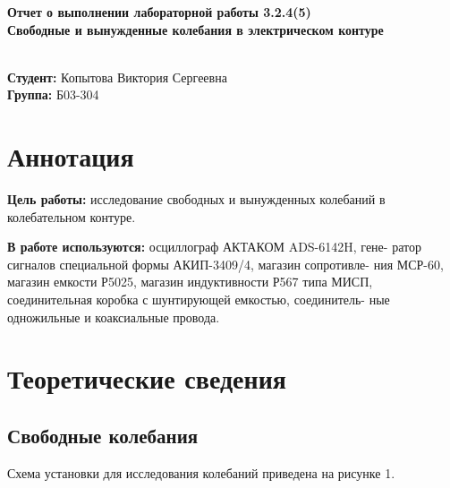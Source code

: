 \documentclass[a4paper,12 pt]{article}
\begin{document}
    \begin{titlepage}
    \begin{center}
        \vspace{4cm}
        \huge {\textbf{Отчет о выполнении лабораторной работы 3.2.4(5) }}
        {} \\
        \vspace{1cm}
        \Large {\textbf{Свободные и вынужденные колебания в электрическом контуре}} \\
        \Large {\textbf{}} \\
        \vspace{10cm}
        \begin{flushright}
        \begin{minipage}{.45\textwidth}
        \normalsize{\textbf{Студент:} Копытова Виктория Сергеевна}\\
        \textbf{Группа:} Б03-304\\
        \end{minipage}
        \end{flushright}   
    \end{center}
    \end{titlepage}
\newpage
 
\section{Аннотация}
\textbf{Цель работы:} исследование свободных и вынужденных колебаний в
колебательном контуре.

\textbf{В работе используются:} осциллограф АКТАКОМ ADS-6142H, гене-
ратор сигналов специальной формы АКИП-3409/4, магазин сопротивле-
ния МСР-60, магазин емкости Р5025, магазин индуктивности Р567 типа
МИСП, соединительная коробка с шунтирующей емкостью, соединитель-
ные одножильные и коаксиальные провода.
	

\section{Теоретические сведения}

\subsection{Свободные колебания}

Схема установки для исследования колебаний приведена на рисунке 1.
\end{document}
